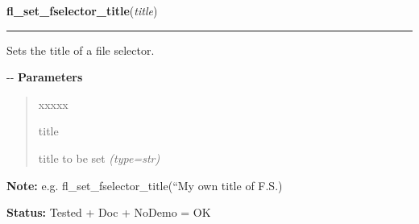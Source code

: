     \label{xformslib:flgoodies:fl_set_fselector_title}

    \vspace{0.5ex}

\hspace{.8\funcindent}\begin{boxedminipage}{\funcwidth}

    \raggedright \textbf{fl\_set\_fselector\_title}(\textit{title})

    \vspace{-1.5ex}

    \rule{\textwidth}{0.5\fboxrule}
\setlength{\parskip}{2ex}

Sets the title of a file selector.

-{}-
\setlength{\parskip}{1ex}
      \textbf{Parameters}
      \vspace{-1ex}

      \begin{quote}
        \begin{Ventry}{xxxxx}

          \item[title]


title to be set
            {\it (type=str)}

        \end{Ventry}

      \end{quote}

\textbf{Note:} 
e.g. fl\_set\_fselector\_title(``My own title of F.S.)


\textbf{Status:} 
Tested + Doc + NoDemo = OK


    \end{boxedminipage}

    \label{xformslib:flgoodies:fl_goodies_atclose}

    \vspace{0.5ex}

